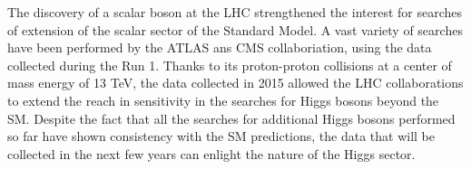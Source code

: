 The discovery of a scalar boson at the LHC
strengthened the interest for searches of extension of the scalar sector of the Standard Model.
A vast variety of searches have been performed by the ATLAS ans CMS collaboriation, using the data collected during the Run 1.  Thanks to its proton-proton collisions at a center of mass energy of 13 TeV, the data collected in 2015 allowed the LHC collaborations to extend the reach in sensitivity in the searches for Higgs bosons beyond the SM. Despite the fact that all the searches for additional Higgs bosons performed so far have shown consistency with the SM predictions, the data that will be collected in the next few years can enlight the nature of the Higgs sector.